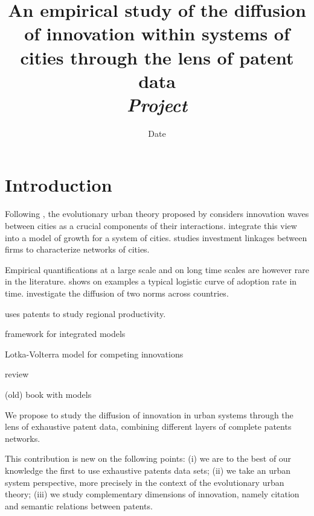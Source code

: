 


\title{An empirical study of the diffusion of innovation within systems of cities through the lens of patent data\\
\textit{Project}
}
\author{}
\date{Date}


\maketitle

\justify


\begin{abstract}

\end{abstract}




\section{Introduction}

Following \cite{hagerstrand1968innovation}, the evolutionary urban theory proposed by \cite{pumain2018evolutionary} considers innovation waves between cities as a crucial components of their interactions. \cite{favaro2011gibrat} integrate this view into a model of growth for a system of cities. \cite{finance2016villes} studies investment linkages between firms to characterize networks of cities.

Empirical quantifications at a large scale and on long time scales are however rare in the literature. \cite{grubler1996time} shows on examples a typical logistic curve of adoption rate in time. \cite{albuquerque2007spatiotemporal} investigate the diffusion of two norms across countries.

\cite{acs2002patents} uses patents to study regional productivity.

\cite{wejnert2002integrating} framework for integrated models

\cite{sonis1983spatio} Lotka-Volterra model for competing innovations

\cite{meade2006modelling} review

\cite{mahajan1985models} (old) book with models

We propose to study the diffusion of innovation in urban systems through the lens of exhaustive patent data, combining different layers of complete patents networks.

This contribution is new on the following points: (i) we are to the best of our knowledge the first to use exhaustive patents data sets; (ii) we take an urban system perspective, more precisely in the context of the evolutionary urban theory; (iii) we study complementary dimensions of innovation, namely citation and semantic relations between patents.


